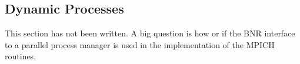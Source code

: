 \documentclass{article}
\begin{document}
\subsubsection{}
\subsubsection{}
\subsubsection{}
\subsubsection{}
\subsubsection{}
\subsubsection{}
\subsubsection{}

\subsection{Dynamic Processes}

This section has not been written.  A big question is how or if the BNR
interface to a parallel process manager is used in the implementation
of the MPICH routines.  

\subsubsection{}
\subsubsection{}
\subsubsection{}
\subsubsection{}
\end{document}
